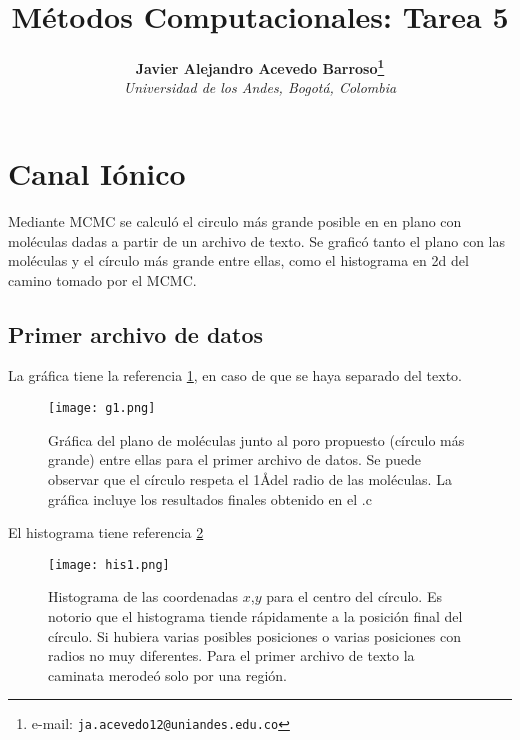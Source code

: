﻿\documentclass[notitlepage,letterpaper,12pt]{article}%
\begin{document}
\title{Métodos Computacionales: Tarea 5}
\author{
\textbf{Javier Alejandro Acevedo Barroso\thanks{e-mail: \texttt{ja.acevedo12@uniandes.edu.co}}}\\
\textit{Universidad de los Andes, Bogotá, Colombia}\\
} %

\maketitle %


\newpage
\section{Canal Iónico}

Mediante MCMC se calculó el circulo más grande posible en en plano con moléculas dadas a partir de un archivo de texto. Se graficó tanto el plano con las moléculas y el círculo más grande entre ellas, como el histograma en 2d del camino tomado por el MCMC.

\subsection{Primer archivo de datos}
La gráfica tiene la referencia \ref{g1d1}, en caso de que se haya separado del texto.

\begin{figure}[h]
  \centering
   \texttt{[image: g1.png]}
  \caption{Gráfica del plano de moléculas junto al poro propuesto (círculo más grande) entre ellas para el primer archivo de datos. Se puede observar que el círculo respeta el 1\AA  del radio de las moléculas. La gráfica incluye los resultados finales obtenido en el .c}
  \label{g1d1}
\end{figure}
\newpage

El histograma tiene referencia \ref{g2d1}
\begin{figure}[h]
  \centering
   \texttt{[image: his1.png]}
  \caption{Histograma de las coordenadas $x$,$y$ para el centro del círculo. Es notorio que el histograma tiende rápidamente a la posición final del círculo. Si hubiera varias posibles posiciones o varias posiciones con radios no muy diferentes. Para el primer archivo de texto la caminata merodeó solo por una región. }
  \label{g2d1}
\end{figure}
\end{document}

